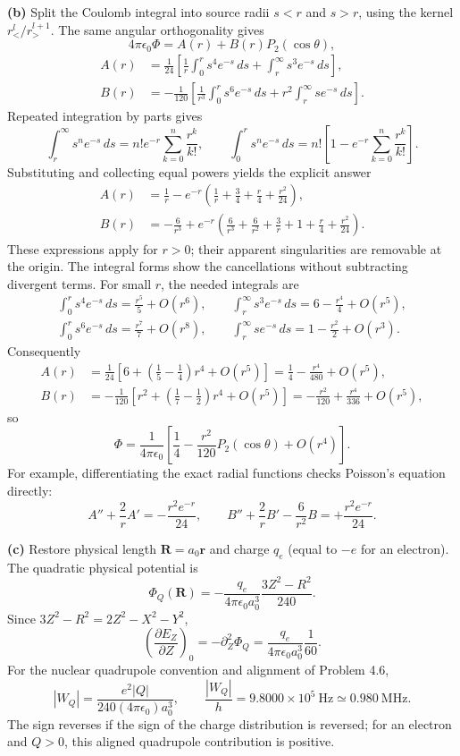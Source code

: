 \textbf{(b)} Split the Coulomb integral into source radii $s<r$ and
$s>r$, using the kernel $r_<^l/r_>^{l+1}$. The same angular
orthogonality gives
\[
4\pi\epsilon_0\Phi=A(r)+B(r)P_2(\cos\theta),
\]
\begin{align*}
A(r)&=\frac1{24}\left[\frac1r\int_0^r s^4e^{-s}\,ds
+\int_r^\infty s^3e^{-s}\,ds\right],\\
B(r)&=-\frac1{120}\left[\frac1{r^3}\int_0^r s^6e^{-s}\,ds
+r^2\int_r^\infty se^{-s}\,ds\right].
\end{align*}
Repeated integration by parts gives
\[
\int_r^\infty s^ne^{-s}\,ds=n!e^{-r}\sum_{k=0}^n\frac{r^k}{k!},
\qquad
\int_0^r s^ne^{-s}\,ds=n!\left[1-e^{-r}\sum_{k=0}^n\frac{r^k}{k!}\right].
\]
Substituting and collecting equal powers yields the explicit answer
\begin{align*}
\boxed{A(r)}&=\boxed{\frac1r-e^{-r}\left(\frac1r+\frac34+\frac r4+\frac{r^2}{24}\right)},\\
\boxed{B(r)}&=\boxed{-\frac6{r^3}+e^{-r}\left(\frac6{r^3}+\frac6{r^2}
+\frac3r+1+\frac r4+\frac{r^2}{24}\right)}.
\end{align*}
These expressions apply for $r>0$; their apparent singularities are
removable at the origin. The integral forms show the cancellations
without subtracting divergent terms. For small $r$, the needed integrals are
\begin{gather*}
\int_0^r s^4e^{-s}\,ds=\frac{r^5}{5}+O(r^6),\qquad
\int_r^\infty s^3e^{-s}\,ds=6-\frac{r^4}{4}+O(r^5),\\
\int_0^r s^6e^{-s}\,ds=\frac{r^7}{7}+O(r^8),\qquad
\int_r^\infty se^{-s}\,ds=1-\frac{r^2}{2}+O(r^3).
\end{gather*}
Consequently
\begin{align*}
A(r)&=\frac1{24}\left[6+\left(\frac15-\frac14\right)r^4+O(r^5)\right]
=\frac14-\frac{r^4}{480}+O(r^5),\\
B(r)&=-\frac1{120}\left[r^2+\left(\frac17-\frac12\right)r^4+O(r^5)\right]
=-\frac{r^2}{120}+\frac{r^4}{336}+O(r^5),
\end{align*}
so
\[
\boxed{\Phi=\frac{1}{4\pi\epsilon_0}
\left[\frac14-\frac{r^2}{120}P_2(\cos\theta)+O(r^4)\right].}
\]
For example, differentiating the exact radial functions checks Poisson's
 equation directly:
\[
A''+\frac2rA'=-\frac{r^2e^{-r}}{24},\qquad
B''+\frac2rB'-\frac6{r^2}B=+\frac{r^2e^{-r}}{24}.
\]

\textbf{(c)} Restore physical length $\mathbf R=a_0\mathbf r$ and
charge $q_e$ (equal to $-e$ for an electron). The quadratic physical
potential is
\[
\Phi_Q(\mathbf R)=-\frac{q_e}{4\pi\epsilon_0a_0^3}
\frac{3Z^2-R^2}{240}.
\]
Since $3Z^2-R^2=2Z^2-X^2-Y^2$,
\[
\left(\frac{\partial E_Z}{\partial Z}\right)_0
=-\partial_Z^2\Phi_Q=\frac{q_e}{4\pi\epsilon_0a_0^3}\frac1{60}.
\]
For the nuclear quadrupole convention and alignment of Problem 4.6,
\[
|W_Q|=\frac{e^2|Q|}{240(4\pi\epsilon_0)a_0^3},\qquad
\boxed{\frac{|W_Q|}{h}=9.8000\times10^5\ \mathrm{Hz}\simeq0.980\ \mathrm{MHz}.}
\]
The sign reverses if the sign of the charge distribution is reversed;
for an electron and $Q>0$, this aligned quadrupole contribution is positive.

